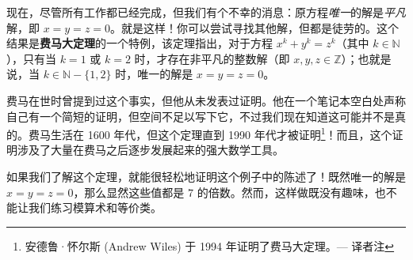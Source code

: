 现在，尽管所有工作都已经完成，但我们有个不幸的消息：原方程\emph{唯一}的解是\emph{平凡}解，即 $x = y = z = 0$。就是这样！你可以尝试寻找其他解，但都是徒劳的。这个结果是\textbf{费马大定理}的一个特例，该定理指出，对于方程 $x^k + y^k = z^k$（其中 $k \in \mathbb{N}$），只有当 $k = 1$ 或 $k = 2$ 时，才存在非平凡的整数解（即 $x, y, z \in \mathbb{Z}$）；也就是说，当 $k \in \mathbb{N} - \{1, 2\}$ 时，唯一的解是 $x = y = z = 0$。

费马在世时曾提到过这个事实，但他从未发表过证明。他在一个笔记本空白处声称自己有一个简短的证明，但空间不足以写下它，不过我们现在知道这可能并不是真的。费马生活在 1600 年代，但这个定理直到 1990 年代才被证明\footnote{安德鲁·怀尔斯 (Andrew Wiles) 于 1994 年证明了费马大定理。--- 译者注}！而且，这个证明涉及了大量在费马之后逐步发展起来的强大数学工具。

如果我们了解这个定理，就能很轻松地证明这个例子中的陈述了！既然唯一的解是 $x = y = z = 0$，那么显然这些值都是 $7$ 的倍数。然而，这样做既没有趣味，也不能让我们练习模算术和等价类。\\

